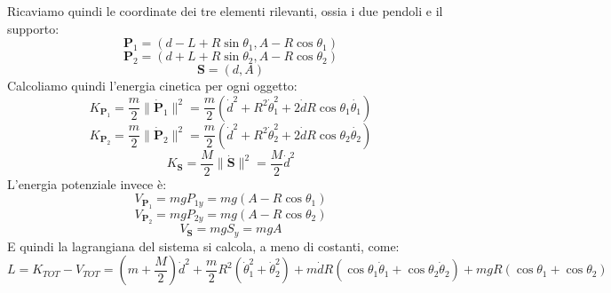\documentclass[11pt, a4paper, twoside]{article}
\begin{document}
Ricaviamo quindi le coordinate dei tre elementi rilevanti, ossia i due pendoli e il supporto:
$$
\mathbf{P}_1 = (d - L + R \sin \theta_1, A - R \cos \theta_1 ) 
$$
$$
\mathbf{P}_2 = (d + L + R \sin \theta_2, A - R \cos \theta_2 ) 
$$
$$
\mathbf{S} = (d , A) 
$$
Calcoliamo quindi l'energia cinetica per ogni oggetto:
$$
K_{\mathbf{P}_1}=  \frac{m}{2} \lVert \dot{\mathbf{P}}_1 \rVert^2 =  \frac{m}{2}(\dot{d}^2 + R^2 \dot\theta_1^2+ 2\dot{d}R\cos\theta_1 \dot{\theta_1}) 
$$
$$
K_{\mathbf{P}_2} = \frac{m}{2} \lVert \dot{\mathbf{P}}_2 \rVert^2 =  \frac{m}{2}(\dot{d}^2 + R^2 \dot\theta_2^2+ 2\dot{d}R\cos\theta_2 \dot{\theta_2})  
$$
$$
K_{\mathbf{S}} =  \frac{M}{2} \lVert \dot{\mathbf{S}} \rVert^2 = \frac{M}{2} \dot{d}^2
$$
L'energia potenziale invece è:
$$
V_{\mathbf{P}_1}= mg P_{1y} = mg (A - R \cos \theta_1 )
$$
$$
V_{\mathbf{P}_2} = mg P_{2y} = mg (A - R \cos \theta_2 ) 
$$
$$
V_{\mathbf{S}} = mg S_{y} = mgA
$$
E quindi la lagrangiana del sistema si calcola, a meno di costanti, come:
$$
L = K_{TOT} - V_{TOT} = \left(m+ \frac{M}{2}\right) \dot{d}^2 + \frac{m}{2} R^2 (\dot\theta_1^2 + \dot\theta_2^2) + m \dot{d} R (\cos\theta_1 \dot\theta_1 + \cos \theta_2 \dot \theta_2) + mgR(\cos\theta_1 + \cos \theta_2)
$$
\end{document}
